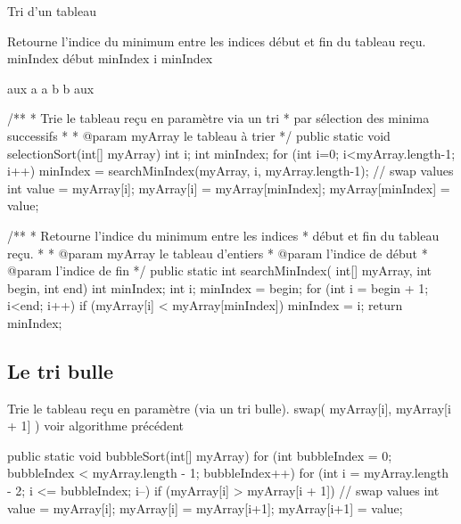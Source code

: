\begin{Fiche}{Tri d’un tableau}
\begin{pseudocode}
		\Empty
		\LComment Retourne l’indice du minimum entre les indices début 
		et fin du tableau reçu.
			\Let minIndex \Gets début
					\Let minIndex \Gets i
				\EndIf
			\EndFor
			\Return minIndex
		\EndAlgo

		\Empty
			\Let aux \Gets a
			\Let a \Gets b
			\Let b \Gets aux
		\EndAlgo
	\end{pseudocode}

	\begin{java}
/**
 * Trie le tableau reçu en paramètre via un tri
 * par sélection des minima successifs
 *
 * @param myArray le tableau à trier
 */
public static void selectionSort(int[] myArray){
	int i;
	int minIndex;
	for (int i=0; i<myArray.length-1; i++){
		minIndex = searchMinIndex(myArray, i, myArray.length-1);
		// swap values
		int value = myArray[i];
		myArray[i] = myArray[minIndex];
		myArray[minIndex] = value;
	}
}

/**
 * Retourne l'indice du minimum entre les indices
 * début et fin du tableau reçu.
 * 
 * @param myArray le tableau d'entiers
 * @param l'indice de début
 * @param l'indice de fin
 */
public static int searchMinIndex(
		int[] myArray,
		int begin,
		int end){
	int minIndex;
	int i;
	minIndex = begin;
	for (int i = begin + 1; i<end; i++){
		if (myArray[i] < myArray[minIndex]) {
			minIndex = i;
		}
	}
	return minIndex;	
}
	\end{java}



	

\subsection*{Le tri bulle}

	\begin{pseudocode}
	\LComment Trie le tableau reçu en paramètre (via un tri bulle).
						\Stmt swap( myArray[i], myArray[i + 1] )
						\RComment voir algorithme précédent
					\EndIf
				\EndFor
			\EndFor
		\EndAlgo
	\end{pseudocode}
	
	\begin{java}
public static void bubbleSort(int[] myArray){
	for (int bubbleIndex = 0; 
			bubbleIndex < myArray.length - 1; 
			bubbleIndex++){
		for (int i = myArray.length - 2; i <= bubbleIndex; i--){
			if (myArray[i] > myArray[i + 1]){
				// swap values
				int value = myArray[i];
				myArray[i] = myArray[i+1];
				myArray[i+1] = value;			
			}
		}
	}
}
	\end{java}
	


	
\end{Fiche}
